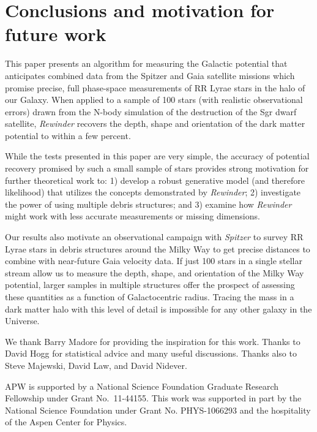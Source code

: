 \documentclass{emulateapj}
\begin{document}
\section{Conclusions and motivation for future work}
\label{sec:conclusion}

This paper presents an algorithm for measuring the Galactic potential
that anticipates combined data from the Spitzer and Gaia satellite
missions which promise precise, full phase-space measurements of RR
Lyrae stars in the halo of our Galaxy. When applied to a sample of 100
stars (with realistic observational errors) drawn from the
\cite{law10} N-body simulation of the destruction of the Sgr dwarf
satellite, \emph{Rewinder} recovers the depth, shape and orientation of the dark
matter potential to within a few percent.

While the tests presented in this paper are very simple, the accuracy of potential recovery promised by such a small sample of stars 
provides strong motivation for further theoretical work to: 1) develop a robust generative model (and therefore likelihood) that utilizes the concepts demonstrated by \emph{Rewinder}; 2) investigate the power of using multiple debris structures; and 3) examine how \emph{Rewinder} might work with less accurate measurements or missing dimensions. 

Our results also motivate an observational campaign with \emph{Spitzer} to survey RR Lyrae stars in debris structures around the Milky Way to get precise distances to combine with near-future Gaia velocity data. 
If just 100 stars in a single stellar stream allow us to measure the depth, shape, and orientation of the Milky Way potential, larger samples in multiple structures offer the prospect of assessing these quantities as a function of Galactocentric radius. Tracing the mass in a dark matter halo with this level of detail is impossible for any other galaxy in the Universe.

\acknowledgments
We thank Barry Madore for providing the inspiration for this work. Thanks to 
David Hogg for statistical advice and many useful discussions. Thanks also to
Steve Majewski, David Law, and David Nidever.

APW is supported by a National Science Foundation Graduate Research
Fellowship under Grant No.\ 11-44155. This work was supported in part by 
the National Science Foundation under Grant No. PHYS-1066293 and the 
hospitality of the Aspen Center for Physics.

%

\end{document}
